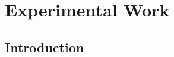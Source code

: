 \chapter{Experimental Work}

\ifpdf
    \graphicspath{{Chapter6/Figs/Raster/}{Chapter6/Figs/PDF/}{Chapter6/Figs/}}
\else
    \graphicspath{{Chapter6/Figs/Vector/}{Chapter6/Figs/}}
\fi

\section{Introduction}
